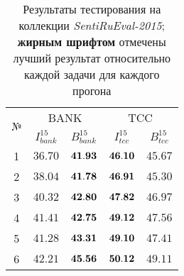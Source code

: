 \begin{table}[ht!]
\centering
\caption{Результаты тестирования на коллекции {\it SentiRuEval-2015};
   {\bf жирным шрифтом} отмечены лучший результат относительно каждой задачи для
   каждого прогона
}
\label{table:results2015}
\begin{tabular}{ccccc}
\hline
\multicolumn{1}{c|}{\multirow{2}{*}{№}} & \multicolumn{2}{c|}{BANK}                                                   & \multicolumn{2}{c}{TCC}                                                  \\ \cline{2-5}
\multicolumn{1}{c|}{}                   & \multicolumn{1}{c|}{$I_{bank}^{15}$} & \multicolumn{1}{c|}{$B_{bank}^{15}$} & \multicolumn{1}{c|}{$I_{tcc}^{15}$} & \multicolumn{1}{c}{$B_{tcc}^{15}$} \\ \hline
1                                       & $36.70$                              & ${\bf 41.93}$                        & ${\bf 46.10}$                       & $45.67$                            \\
2                                       & $38.04$                              & ${\bf 41.78}$                        & ${\bf 46.91}$                       & $45.30$                            \\
3                                       & $40.32$                              & ${\bf 42.80}$                        & ${\bf 47.82}$                       & $46.97$                            \\
4                                       & $41.41$                              & ${\bf 42.75}$                        & ${\bf 49.12}$                       & $47.56$                            \\
5                                       & $41.28$                              & ${\bf 43.31}$                        & ${\bf 49.10}$                       & $47.41$                            \\
6                                       & $42.21$                              & ${\bf 45.56}$                        & ${\bf 50.12}$                       & $49.11$                            \\ \hline
\end{tabular}
\end{table}
